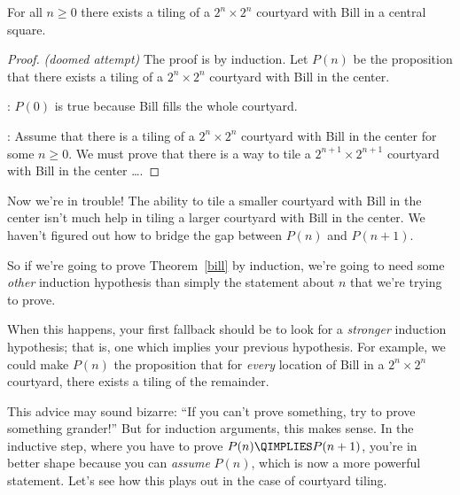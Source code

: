 \begin{theorem}\label{bill}
For all $n \geq 0$ there exists a tiling of a $2^n \times 2^n$
courtyard with Bill in a central square.
\end{theorem}

\begin{proof}
\emph{(doomed attempt)} The proof is by induction.  Let $P(n)$ be the
proposition that there exists a tiling of a $2^n \times 2^n$ courtyard
with Bill in the center.

: $P(0)$ is true because Bill fills the whole courtyard.

: Assume that there is a tiling of a
$2^n \times 2^n$ courtyard with Bill in the center for some $n \geq
0$.  We must prove that there is a way to tile a $2^{n+1} \times
2^{n+1}$ courtyard with Bill in the center \dots.
\end{proof}

Now we're in trouble!  The ability to tile a smaller courtyard with Bill
in the center isn't much help in tiling a larger courtyard with Bill in
the center.  We haven't figured out how to bridge the gap between $P(n)$
and $P(n+1)$.

So if we're going to prove Theorem~\ref{bill} by induction, we're going to
need some \emph{other} induction hypothesis than simply the statement
about $n$ that we're trying to prove.


\iffalse
\textbf{Maybe you can figure out a good induction hypothesis for
  tiling.  In class we'll present some hypotheses that do work.}
\fi

When this happens, your first fallback should be to look for a
\emph{stronger} induction hypothesis; that is, one which implies
your previous hypothesis.  For example, we could make $P(n)$ the
proposition that for \emph{every} location of Bill in a $2^n \times
2^n$ courtyard, there exists a tiling of the remainder.

This advice may sound bizarre: ``If you can't prove something, try to
prove something grander!''  But for induction arguments, this makes
sense.  In the inductive step, where you have to prove $P(n) \QIMPLIES
P(n+1)$, you're in better shape because you can \emph{assume} $P(n)$,
which is now a more powerful statement.  Let's see how this plays out
in the case of courtyard tiling.

